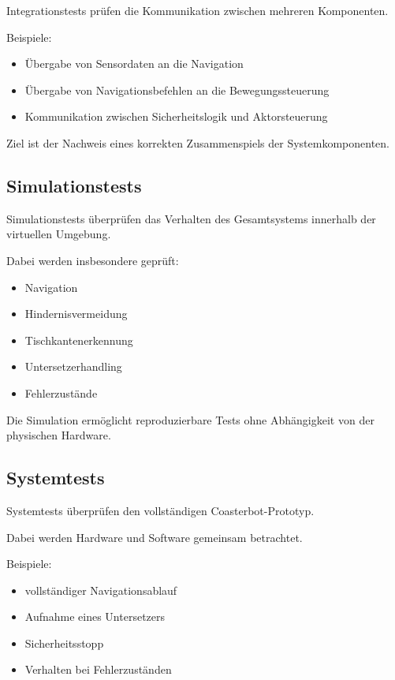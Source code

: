 \documentclass[
  a4paper,
  12pt,
  DIV=12,        %
  parskip=half,  %
  headings=small %
]{scrartcl}
\theoremstyle{definition}
\providecommand{\tightlist}{%
  \setlength{\itemsep}{0pt}\setlength{\parskip}{0pt}}
\theoremstyle{definition}
\begin{document}
Integrationstests prüfen die Kommunikation zwischen mehreren
Komponenten.

Beispiele:

\begin{itemize}
\tightlist
\item
  Übergabe von Sensordaten an die Navigation
\item
  Übergabe von Navigationsbefehlen an die Bewegungssteuerung
\item
  Kommunikation zwischen Sicherheitslogik und Aktorsteuerung
\end{itemize}

Ziel ist der Nachweis eines korrekten Zusammenspiels der
Systemkomponenten.

\subsection{Simulationstests}\label{simulationstests}

Simulationstests überprüfen das Verhalten des Gesamtsystems innerhalb
der virtuellen Umgebung.

Dabei werden insbesondere geprüft:

\begin{itemize}
\tightlist
\item
  Navigation
\item
  Hindernisvermeidung
\item
  Tischkantenerkennung
\item
  Untersetzerhandling
\item
  Fehlerzustände
\end{itemize}

Die Simulation ermöglicht reproduzierbare Tests ohne Abhängigkeit von
der physischen Hardware.

\subsection{Systemtests}\label{systemtests}

Systemtests überprüfen den vollständigen Coasterbot-Prototyp.

Dabei werden Hardware und Software gemeinsam betrachtet.

Beispiele:

\begin{itemize}
\tightlist
\item
  vollständiger Navigationsablauf
\item
  Aufnahme eines Untersetzers
\item
  Sicherheitsstopp
\item
  Verhalten bei Fehlerzuständen
\end{itemize}
\end{document}
